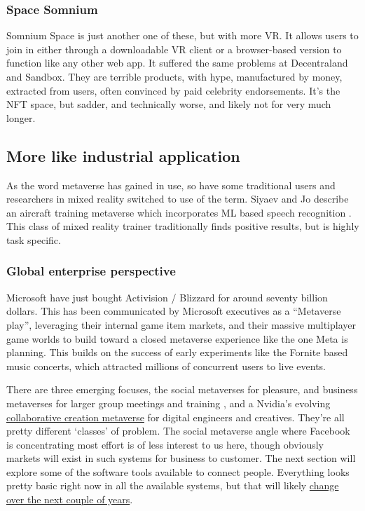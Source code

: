 \subsubsection{Space Somnium}  
Somnium Space is just another one of these, but with more VR. It allows users to join in either through a downloadable VR client or a browser-based version to function like any other web app. It suffered the same problems at Decentraland and Sandbox. They are terrible products, with hype, manufactured by money, extracted from users, often convinced by paid celebrity endorsements. It's the NFT space, but sadder, and technically worse, and likely not for very much longer.
\subsection{More like industrial application}
As the word metaverse has gained in use, so have some traditional users and researchers in mixed reality switched to use of the term.
Siyaev and Jo describe an aircraft training metaverse which incorporates ML based speech recognition \cite{siyaev2021towards}. This class of mixed reality trainer traditionally finds positive results, but is highly task specific.   
 \subsubsection{Global enterprise perspective}
Microsoft have just bought Activision / Blizzard for around seventy billion dollars. This has been communicated by Microsoft executives as a ``Metaverse play'', leveraging their internal game item markets, and their massive multiplayer game worlds to build toward a closed metaverse experience like the one Meta is planning.
This builds on the success of early experiments like the Fornite based music concerts, which attracted millions of concurrent users to live events.

There are three emerging focuses, the social metaverses for pleasure, and business metaverses for larger group meetings and training \cite{heiphetz2010training, aldrich2005learning}, and a Nvidia's evolving \href{https://blogs.nvidia.com/blog/2022/08/09/omniverse-siggraph/}{collaborative creation metaverse} for digital engineers and creatives. They're all pretty different `classes' of problem. The social metaverse angle where Facebook is concentrating most effort is of less interest to us here, though obviously markets will exist in such systems for business to customer. The next section will explore some of the software tools available to connect people. Everything looks pretty basic right now in all the available systems, but that will likely \href{https://www.youtube.com/watch?v=cRLnR4Kot2M}{change over the next couple of years}.
